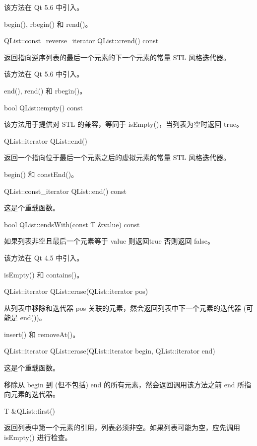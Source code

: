 该方法在 Qt 5.6 中引入。

\begin{seeAlso}
begin(), rbegin() 和 rend()。
\end{seeAlso}

QList::const\_reverse\_iterator QList::crend() const

返回指向逆序列表的最后一个元素的下一个元素的常量 STL 风格迭代器。

该方法在 Qt 5.6 中引入。

\begin{seeAlso}
end(), rend() 和 rbegin()。
\end{seeAlso}

bool QList::empty() const

该方法用于提供对 STL 的兼容，等同于 isEmpty()，当列表为空时返回 true。

QList::iterator QList::end()

返回一个指向位于最后一个元素之后的虚拟元素的常量 STL 风格迭代器。

\begin{seeAlso}
begin() 和 constEnd()。
\end{seeAlso}

QList::const\_iterator QList::end() const

这是个重载函数。

bool QList::endsWith(const T \&value) const

如果列表非空且最后一个元素等于 value 则返回true 否则返回 false。

该方法在 Qt 4.5 中引入。

\begin{seeAlso}
isEmpty() 和 contains()。
\end{seeAlso}

QList::iterator QList::erase(QList::iterator pos)

从列表中移除和迭代器 pos 关联的元素，然会返回列表中下一个元素的迭代器 (可能是 end())。

\begin{seeAlso}
insert() 和 removeAt()。
\end{seeAlso}

QList::iterator QList::erase(QList::iterator begin, QList::iterator end)

这是个重载函数。

移除从 begin 到 (但不包括) end 的所有元素，然会返回调用该方法之前 end
所指向元素的迭代器。

T \&QList::first()

返回列表中第一个元素的引用，列表必须非空。如果列表可能为空，应先调用 isEmpty() 进行检查。

